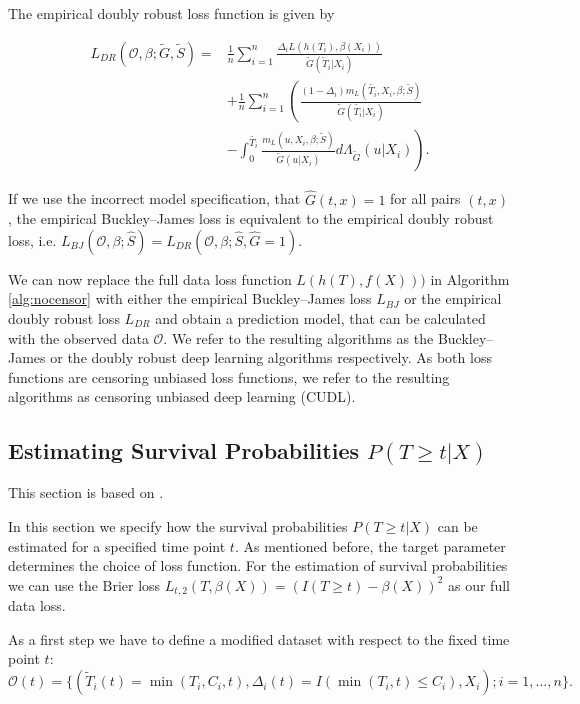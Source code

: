 \documentclass[12pt, a4paper]{scrartcl}
\theoremstyle{definition}
\theoremstyle{plain}
\numberwithin{equation}{section}
\numberwithin{figure}{section}
\numberwithin{table}{section}
\begin{document}
	The empirical doubly robust loss function is given by
	
	\begin{equation*}
	\begin{split}
	L_{DR}(\mathcal{O}, \beta; \tilde{G}, \tilde{S}) = & \frac{1}{n} \sum_{i=1}^n \frac{\Delta_i L(h(T_i),\beta(X_i))}{\tilde{G}(\tilde{T}_i\vert X_i)}\\
	~ & + \frac{1}{n} \sum_{i=1}^n \left(\frac{(1-\Delta_i)m_L(\tilde{T_i}, X_i, \beta; \tilde{S})}{\tilde{G}(\tilde{T_i}\vert X_i)} \right.\\
	& - \left. \int _0^{\tilde{T_i}} \frac{m_L(u, X_i, \beta; \tilde{S})}{\tilde{G}(u \vert X_i)} d \Lambda_{\tilde{G}}(u \vert X_i) \right).
	\end{split}
	\end{equation*}
	
	If we use the incorrect model specification, that $\hat{G}(t,x)=1$ for all pairs $(t,x)$, the empirical  Buckley--James loss is equivalent to the empirical doubly robust loss, i.e. $L_{BJ}(\mathcal{O}, \beta; \hat{S})=L_{DR}(\mathcal{O}, \beta; \hat{S}, \hat{G} = 1)$.
	
	We can now replace the full data loss function $L(h(T), f(X)))$ in Algorithm \ref{alg:nocensor} with either the empirical Buckley--James loss $L_{BJ}$ or the empirical doubly robust loss $L_{DR}$ and obtain a prediction model, that can be calculated with the observed data $\mathcal{O}$.
	We refer to the resulting algorithms as the Buckley--James or the doubly robust deep learning algorithms respectively.
	As both loss functions are censoring unbiased loss functions, we refer to the resulting algorithms as censoring unbiased deep learning (CUDL). 
	
	\subsection{Estimating Survival Probabilities $P(T\geq t \vert X)$}
	
	This section is based on \citet*{basearticle}.
	
	In this section we specify how the survival probabilities $P(T\geq t \vert X)$ can be estimated for a specified time point $t$.
	As mentioned before, the target parameter determines the choice of loss function.
	For the estimation of survival probabilities we can use the Brier loss $L_{t,2}(T, \beta(X)) = (I(T \geq t) - \beta(X))^2$ as our full data loss.
	
	As a first step we have to define a modified dataset with respect to the fixed time point $t$:
	\begin{equation*}
		\mathcal{O}(t) = \{(\tilde{T}_i(t)=\min(T_i, C_i, t), \Delta_i(t) = I(\min(T_i, t) \leq C_i), X_i); i = 1,\dots,n\}.
	\end{equation*}
	
\end{document}
